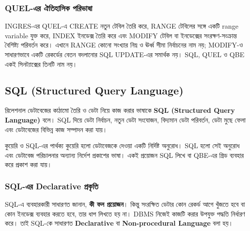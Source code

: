\subsubsection{QUEL-এর ঐতিহাসিক পরিভাষা}
INGRES-এর QUEL-এ CREATE নতুন টেবিল তৈরি করে, RANGE টেবিলের সঙ্গে একটি range variable যুক্ত করে, INDEX ইনডেক্স তৈরি করে এবং MODIFY টেবিল বা ইনডেক্সের সংরক্ষণ-সংক্রান্ত বৈশিষ্ট্য পরিবর্তন করে। এখানে RANGE কোনো সংখ্যার নিম্ন ও ঊর্ধ্ব সীমা নির্বাচনের নাম নয়; MODIFY-ও সাধারণভাবে একটি রেকর্ডের বেতন বদলানোর SQL UPDATE-এর সমার্থক নয়। SQL, QUEL ও QBE একই সিনট্যাক্সের তিনটি নাম নয়।

\subsection{SQL (Structured Query Language)}

\begin{definitionbox}{}

রিলেশনাল ডেটাবেজের কাঠামো তৈরি ও ডেটা নিয়ে কাজ করার ভাষাকে
\textbf{SQL (Structured Query Language)} বলে। SQL দিয়ে ডেটা নির্বাচন,
নতুন ডেটা সংযোজন, বিদ্যমান ডেটা পরিবর্তন, ডেটা মুছে ফেলা এবং
ডেটাবেজের বিভিন্ন কাজ সম্পাদন করা যায়।

\end{definitionbox}

\begin{keypointbox}{কুয়েরি ও SQL-এর পার্থক্য}
কুয়েরি হলো ডেটাবেজকে দেওয়া একটি নির্দিষ্ট অনুরোধ। SQL হলো সেই অনুরোধ এবং ডেটাবেজ পরিচালনার অন্যান্য নির্দেশ প্রকাশের ভাষা। একই প্রয়োজন SQL লিখে বা QBE-এর গ্রিড ব্যবহার করে প্রকাশ করা যায়।
\end{keypointbox}

\subsubsection{SQL-এর Declarative প্রকৃতি}

SQL-এ ব্যবহারকারী সাধারণত জানান, \textbf{কী ফল প্রয়োজন}। কিন্তু সংরক্ষিত ডেটার কোন রেকর্ড আগে খুঁজতে হবে বা কোন ইনডেক্স ব্যবহার করতে হবে, তার ধাপ লিখতে হয় না। DBMS নিজেই কাজটি করার উপযুক্ত পদ্ধতি নির্ধারণ করে। তাই SQL-কে সাধারণত
\textbf{Declarative} বা \textbf{Non-procedural Language}
বলা হয়।

